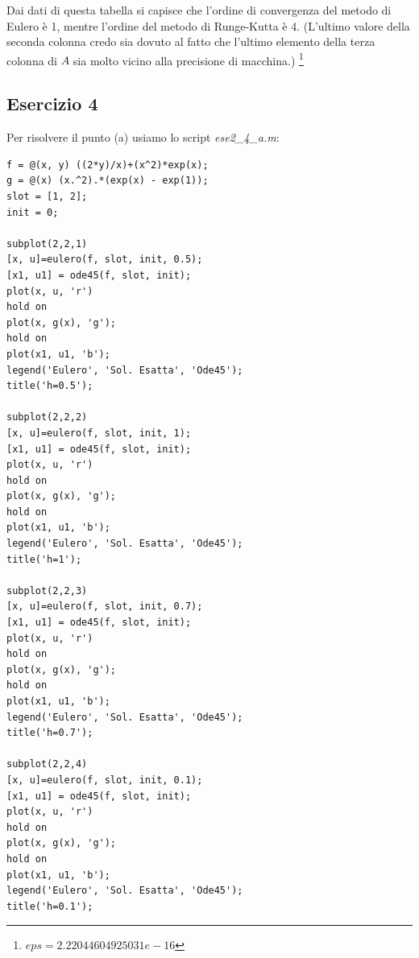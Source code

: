 \documentclass[11pt,a4paper,twoside,openright,titlepage,
headinclude,footinclude,BCOR5mm,
numbers=noenddot,cleardoublepage=empty,
tablecaptionabove]{scrbook}
\begin{document}
Dai dati di questa tabella si capisce che l'ordine di convergenza del metodo di Eulero è 1, mentre l'ordine
del metodo di Runge-Kutta è 4. (L'ultimo valore della seconda colonna credo sia dovuto al fatto che l'ultimo elemento 
della terza colonna di $A$ sia molto vicino alla precisione di macchina.) %
\footnote{$eps = 2.22044604925031e-16$}



\newpage
\subsection{Esercizio 4}
Per risolvere il punto (a) usiamo lo script \emph{ese2\_4\_a.m}:
\begin{lstlisting}[frame=trBL]
f = @(x, y) ((2*y)/x)+(x^2)*exp(x);
g = @(x) (x.^2).*(exp(x) - exp(1));
slot = [1, 2];
init = 0;

subplot(2,2,1)
[x, u]=eulero(f, slot, init, 0.5);
[x1, u1] = ode45(f, slot, init);
plot(x, u, 'r')
hold on
plot(x, g(x), 'g');
hold on
plot(x1, u1, 'b');
legend('Eulero', 'Sol. Esatta', 'Ode45');
title('h=0.5');

subplot(2,2,2)
[x, u]=eulero(f, slot, init, 1);
[x1, u1] = ode45(f, slot, init);
plot(x, u, 'r')
hold on
plot(x, g(x), 'g');
hold on
plot(x1, u1, 'b');
legend('Eulero', 'Sol. Esatta', 'Ode45');
title('h=1');

subplot(2,2,3)
[x, u]=eulero(f, slot, init, 0.7);
[x1, u1] = ode45(f, slot, init);
plot(x, u, 'r')
hold on
plot(x, g(x), 'g');
hold on
plot(x1, u1, 'b');
legend('Eulero', 'Sol. Esatta', 'Ode45');
title('h=0.7');

subplot(2,2,4)
[x, u]=eulero(f, slot, init, 0.1);
[x1, u1] = ode45(f, slot, init);
plot(x, u, 'r')
hold on
plot(x, g(x), 'g');
hold on
plot(x1, u1, 'b');
legend('Eulero', 'Sol. Esatta', 'Ode45');
title('h=0.1');
\end{lstlisting}
\end{document}
